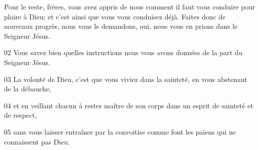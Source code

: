 Pour le reste, frères, vous avez appris de nous comment il faut vous conduire pour plaire à Dieu; et c’est ainsi que vous vous conduisez déjà. Faites donc de nouveaux progrès, nous vous le demandons, oui, nous vous en prions dans le Seigneur Jésus.

02 Vous savez bien quelles instructions nous vous avons données de la part du Seigneur Jésus.

03 La volonté de Dieu, c’est que vous viviez dans la sainteté, en vous abstenant de la débauche,

04 et en veillant chacun à rester maître de son corps dans un esprit de sainteté et de respect,

05 sans vous laisser entraîner par la convoitise comme font les païens qui ne connaissent pas Dieu.
